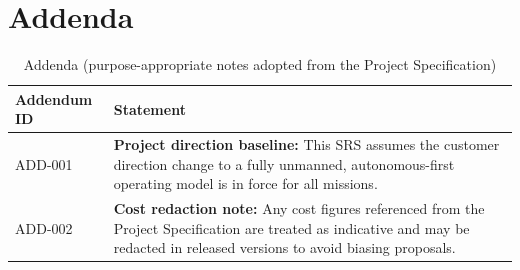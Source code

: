 \documentclass[11pt,a4paper]{article}
\begin{document}
\setlength{\tabcolsep}{6pt}
\normalsize

\clearpage
\setcounter{page}{1}
\renewcommand{\thepage}{An-\arabic{page}}
\setcounter{table}{0}
\renewcommand{\thetable}{An-\arabic{table}}
\section*{Addenda}
\label{sec:addenda}

\begin{table}[H]
\centering
\small
\renewcommand{\arraystretch}{1.2}
\begin{tabular}{|p{}|p{}|}
\hline
\rowcolor{tableheader}
\textbf{Addendum ID} & \textbf{Statement} \\
\hline
ADD-001 & \textbf{Project direction baseline:} This SRS assumes the customer direction change to a fully unmanned, autonomous-first operating model is in force for all missions. \\
\hline
ADD-002 & \textbf{Cost redaction note:} Any cost figures referenced from the Project Specification are treated as indicative and may be redacted in released versions to avoid biasing proposals. \\
\hline
\end{tabular}
\caption{Addenda (purpose-appropriate notes adopted from the Project Specification)}
\label{tab:addenda}
\end{table}
\end{document}
